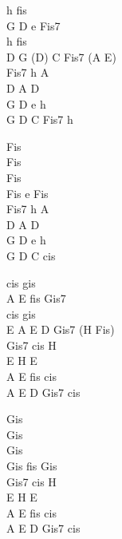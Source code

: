 \begin{chord}
    h fis\\
    G D e Fis7\\
    h fis\\
    D G (D) C Fis7 (A E)\\
    Fis7 h A\\
    D A D\\
    G D e h\\
    G D C Fis7 h

    Fis\\
    Fis\\
    Fis\\
    Fis e Fis\\
    Fis7 h A\\
    D A D\\
    G D e h\\
    G D C cis

    cis gis\\
    A E fis Gis7\\
    cis gis\\
    E A E D Gis7 (H Fis)\\
    Gis7 cis H\\
    E H E\\
    A E fis cis\\
    A E D Gis7 cis

    Gis\\
    Gis\\
    Gis\\
    Gis fis Gis\\
    Gis7 cis H\\
    E H E\\
    A E fis cis\\
    A E D Gis7 cis
\end{chord}